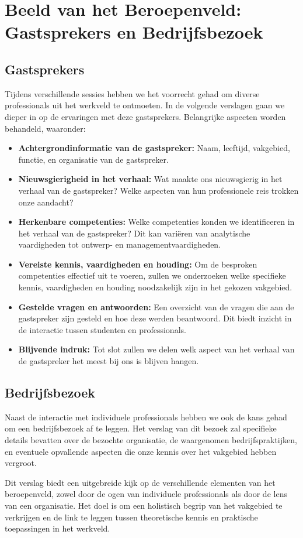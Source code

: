 
\section{Beeld van het Beroepenveld: Gastsprekers en Bedrijfsbezoek}
\subsection{Gastsprekers}

Tijdens verschillende sessies hebben we het voorrecht gehad om diverse professionals uit het werkveld te ontmoeten. In de volgende verslagen gaan we dieper in op de ervaringen met deze gastsprekers. Belangrijke aspecten worden behandeld, waaronder:

\begin{itemize}
    \item \textbf{Achtergrondinformatie van de gastspreker:} Naam, leeftijd, vakgebied, functie, en organisatie van de gastspreker.
    \item \textbf{Nieuwsgierigheid in het verhaal:} Wat maakte ons nieuwsgierig in het verhaal van de gastspreker? Welke aspecten van hun professionele reis trokken onze aandacht?
    \item \textbf{Herkenbare competenties:} Welke competenties konden we identificeren in het verhaal van de gastspreker? Dit kan variëren van analytische vaardigheden tot ontwerp- en managementvaardigheden.
    \item \textbf{Vereiste kennis, vaardigheden en houding:} Om de besproken competenties effectief uit te voeren, zullen we onderzoeken welke specifieke kennis, vaardigheden en houding noodzakelijk zijn in het gekozen vakgebied.
    \item \textbf{Gestelde vragen en antwoorden:} Een overzicht van de vragen die aan de gastspreker zijn gesteld en hoe deze werden beantwoord. Dit biedt inzicht in de interactie tussen studenten en professionals.
    \item \textbf{Blijvende indruk:} Tot slot zullen we delen welk aspect van het verhaal van de gastspreker het meest bij ons is blijven hangen.
\end{itemize}

\subsection{Bedrijfsbezoek}
Naast de interactie met individuele professionals hebben we ook de kans gehad om een bedrijfsbezoek af te leggen. Het verslag van dit bezoek zal specifieke details bevatten over de bezochte organisatie, de waargenomen bedrijfspraktijken, en eventuele opvallende aspecten die onze kennis over het vakgebied hebben vergroot.

Dit verslag biedt een uitgebreide kijk op de verschillende elementen van het beroepenveld, zowel door de ogen van individuele professionals als door de lens van een organisatie. Het doel is om een holistisch begrip van het vakgebied te verkrijgen en de link te leggen tussen theoretische kennis en praktische toepassingen in het werkveld.
